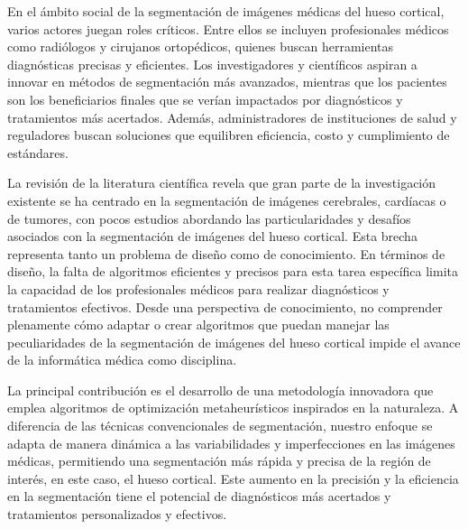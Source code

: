 \documentclass[conference]{IEEEtran}
\begin{document}
En el ámbito social de la segmentación de imágenes médicas del hueso cortical, varios actores juegan roles críticos. Entre ellos se incluyen profesionales médicos como radiólogos y cirujanos ortopédicos, quienes buscan herramientas diagnósticas precisas y eficientes. Los investigadores y científicos aspiran a innovar en métodos de segmentación más avanzados, mientras que los pacientes son los beneficiarios finales que se verían impactados por diagnósticos y tratamientos más acertados. Además, administradores de instituciones de salud y reguladores buscan soluciones que equilibren eficiencia, costo y cumplimiento de estándares.

La revisión de la literatura científica revela que gran parte de la investigación existente se ha centrado en la segmentación de imágenes cerebrales, cardíacas o de tumores, con pocos estudios abordando las particularidades y desafíos asociados con la segmentación de imágenes del hueso cortical. Esta brecha representa tanto un problema de diseño como de conocimiento. En términos de diseño, la falta de algoritmos eficientes y precisos para esta tarea específica limita la capacidad de los profesionales médicos para realizar diagnósticos y tratamientos efectivos. Desde una perspectiva de conocimiento, no comprender plenamente cómo adaptar o crear algoritmos que puedan manejar las peculiaridades de la segmentación de imágenes del hueso cortical impide el avance de la informática médica como disciplina.

La principal contribución es el desarrollo de una metodología innovadora que emplea algoritmos de optimización metaheurísticos inspirados en la naturaleza. A diferencia de las técnicas convencionales de segmentación, nuestro enfoque se adapta de manera dinámica a las variabilidades y imperfecciones en las imágenes médicas, permitiendo una segmentación más rápida y precisa de la región de interés, en este caso, el hueso cortical. Este aumento en la precisión y la eficiencia en la segmentación tiene el potencial de diagnósticos más acertados y tratamientos personalizados y efectivos. 
\end{document}
